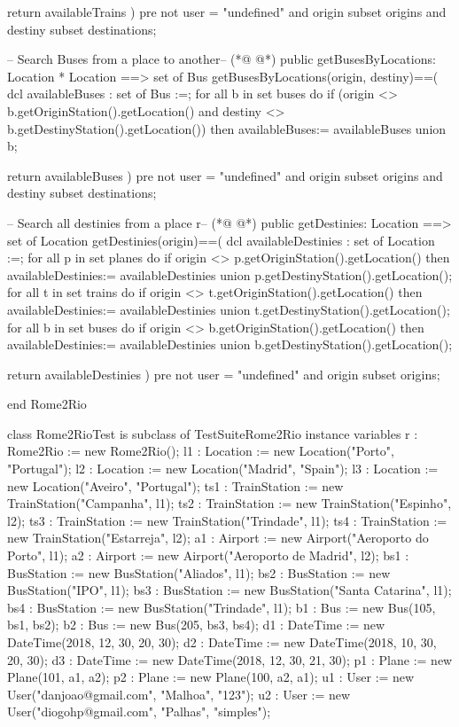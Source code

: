 \begin{vdmpp}[breaklines=true]
 return availableTrains
 )
  pre not user = "undefined"
  and {origin} subset origins
  and {destiny} subset destinations;

    -- Search Buses from a place to another--
(*@
\label{getBusesByLocations:151}
@*)
 public getBusesByLocations: Location * Location ==> set of Bus
 getBusesByLocations(origin, destiny)==(
 dcl availableBuses : set of Bus :={};
 for all b in set buses do
  if (origin <> b.getOriginStation().getLocation() and destiny <> b.getDestinyStation().getLocation())
  then availableBuses:= availableBuses union {b};

 return availableBuses
 )
  pre not user = "undefined"
  and {origin} subset origins
  and {destiny} subset destinations;



 -- Search all destinies from a place r--
(*@
\label{getDestinies:167}
@*)
  public getDestinies: Location ==> set of Location
 getDestinies(origin)==(
 dcl availableDestinies : set of Location :={};
 for all p in set planes do
  if origin <> p.getOriginStation().getLocation()
  then availableDestinies:= availableDestinies union {p.getDestinyStation().getLocation()};
 for all t in set trains do
  if origin <> t.getOriginStation().getLocation()
  then availableDestinies:= availableDestinies union {t.getDestinyStation().getLocation()};
 for all b in set buses do
  if origin <> b.getOriginStation().getLocation()
  then availableDestinies:= availableDestinies union {b.getDestinyStation().getLocation()};


 return availableDestinies
 )
  pre not user = "undefined"
  and {origin} subset origins;


end Rome2Rio

class Rome2RioTest is subclass of TestSuiteRome2Rio
 instance variables
   r : Rome2Rio := new Rome2Rio();
   l1 :  Location := new Location("Porto", "Portugal");
   l2 : Location := new Location("Madrid", "Spain");
   l3 : Location := new Location("Aveiro", "Portugal");
   ts1 : TrainStation := new TrainStation("Campanha", l1);
   ts2 : TrainStation := new TrainStation("Espinho", l2);
   ts3 : TrainStation := new TrainStation("Trindade", l1);
   ts4 : TrainStation := new TrainStation("Estarreja", l2);
   a1 : Airport := new Airport("Aeroporto do Porto", l1);
   a2 : Airport := new Airport("Aeroporto de Madrid", l2);
   bs1 : BusStation := new BusStation("Aliados", l1);
   bs2 : BusStation := new BusStation("IPO", l1);
   bs3 : BusStation := new BusStation("Santa Catarina", l1);
   bs4 : BusStation := new BusStation("Trindade", l1);
   b1 : Bus := new Bus(105, bs1, bs2);
   b2 : Bus := new Bus(205, bs3, bs4);
   d1 : DateTime := new DateTime(2018, 12, 30, 20, 30);
   d2 : DateTime := new DateTime(2018, 10, 30, 20, 30);
   d3 : DateTime := new DateTime(2018, 12, 30, 21, 30);
   p1 : Plane := new Plane(101, a1, a2);
   p2 : Plane := new Plane(100, a2, a1);
   u1 :  User := new User("danjoao@gmail.com", "Malhoa", "123");
   u2 : User := new User("diogohp@gmail.com", "Palhas", "simples");


\end{vdmpp}

